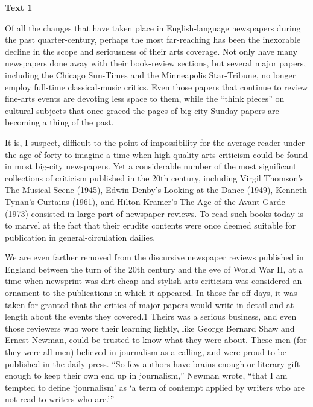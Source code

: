 \begin{center}\textbf{Text 1}\end{center}

\qquad Of all the changes that have taken place in English-language newspapers during the past quarter-century, perhaps the most far-reaching has been the inexorable decline in the scope and seriousness of their arts coverage. Not only have many newspapers done away with their book-review sections, but several major papers, including the Chicago Sun-Times and the Minneapolis Star-Tribune, no longer employ full-time classical-music critics. Even those papers that continue to review fine-arts events are devoting less space to them, while the “think pieces” on cultural subjects that once graced the pages of big-city Sunday papers are becoming a thing of the past.

\qquad It is, I suspect, difficult to the point of impossibility for the average reader under the age of forty to imagine a time when high-quality arts criticism could be found in most big-city newspapers. Yet a considerable number of the most significant collections of criticism published in the 20th century, including Virgil Thomson’s The Musical Scene (1945), Edwin Denby’s Looking at the Dance (1949), Kenneth Tynan’s Curtains (1961), and Hilton Kramer’s The Age of the Avant-Garde (1973) consisted in large part of newspaper reviews. To read such books today is to marvel at the fact that their erudite contents were once deemed suitable for publication in general-circulation dailies.

\qquad We are even farther removed from the discursive newspaper reviews published in England between the turn of the 20th century and the eve of World War II, at a time when newsprint was dirt-cheap and stylish arts criticism was considered an ornament to the publications in which it appeared. In those far-off days, it was taken for granted that the critics of major papers would write in detail and at length about the events they covered.1 Theirs was a serious business, and even those reviewers who wore their learning lightly, like George Bernard Shaw and Ernest Newman, could be trusted to know what they were about. These men (for they were all men) believed in journalism as a calling, and were proud to be published in the daily press. “So few authors have brains enough or literary gift enough to keep their own end up in journalism,” Newman wrote, “that I am tempted to define ‘journalism’ as ‘a term of contempt applied by writers who are not read to writers who are.’”

